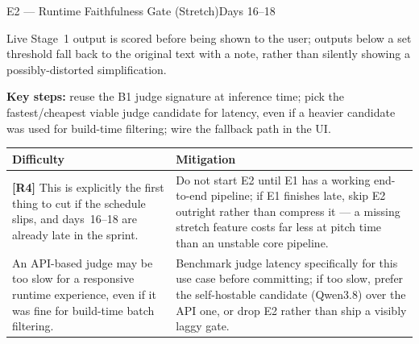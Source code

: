 \documentclass[11pt,a4paper]{article}
\begin{document}
\newpage
\begin{milestonehead}{E2 --- Runtime Faithfulness Gate (Stretch)}{Days 16--18}
\begin{goalbox}
Live Stage~1 output is scored before being shown to the user; outputs below
a set threshold fall back to the original text with a note, rather than
silently showing a possibly-distorted simplification.
\end{goalbox}

\textbf{Key steps:} reuse the B1 judge signature at inference time; pick the
fastest/cheapest viable judge candidate for latency, even if a heavier
candidate was used for build-time filtering; wire the fallback path in the
UI.

\begin{center}
\small
\begin{tabular}{@{}p{6.3cm}p{6.9cm}@{}}
\toprule
\textbf{Difficulty} & \textbf{Mitigation} \\
\midrule
\textbf{[R4]} This is explicitly the first thing to cut if the schedule
slips, and days~16--18 are already late in the sprint. & Do not start E2
until E1 has a working end-to-end pipeline; if E1 finishes late, skip E2
outright rather than compress it --- a missing stretch feature costs far
less at pitch time than an unstable core pipeline. \\
\addlinespace
An API-based judge may be too slow for a responsive runtime experience,
even if it was fine for build-time batch filtering. & Benchmark judge
latency specifically for this use case before committing; if too slow,
prefer the self-hostable candidate (Qwen3.8) over the API one, or drop E2
rather than ship a visibly laggy gate. \\
\bottomrule
\end{tabular}
\end{center}
\end{milestonehead}
\end{document}
